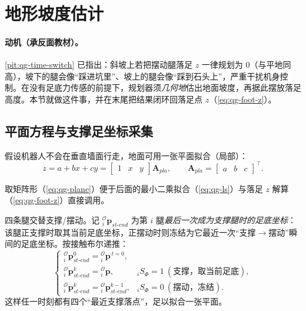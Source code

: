 \section{地形坡度估计}
\label{sec:qg-slope}

\paragraph{动机（承反面教材）。}
\cref{pit:qg-time-switch} 已指出：斜坡上若把摆动腿落足 $z$ 一律规划为 $0$（与平地同高），坡下的腿会像“踩进坑里”、坡上的腿会像“踩到石头上”，严重干扰机身控制\cite{yu2021quadruped}。在没有足底力传感的前提下，规划器须\emph{几何地}估出地面坡度，再据此摆放落足高度。本节就做这件事，并在末尾把结果闭环回落足点 $z$（\cref{eq:qg-foot-z}）。

\subsection{平面方程与支撑足坐标采集}
\label{subsec:qg-plane}

假设机器人不会在垂直墙面行走，地面可用一张平面拟合（局部）\cite{yu2021quadruped}：
\begin{equation}
  z=a+bx+cy=\begin{bmatrix}1 & x & y\end{bmatrix}\mathbf{A}_{pla},
  \qquad
  \mathbf{A}_{pla}=\begin{bmatrix}a & b & c\end{bmatrix}^\top.
  \label{eq:qg-plane}
\end{equation}

取矩阵形（\cref{eq:qg-plane}）便于后面的最小二乘拟合（\cref{eq:qg-ls}）与落足 $z$ 解算（\cref{eq:qg-foot-z}）直接调用。

四条腿交替支撑/摆动。记 ${}_i^{\mathcal{O}}\boldsymbol{p}_{st\text{-}end}$ 为第 $i$ 腿\emph{最后一次成为支撑腿时的足底坐标}：该腿正支撑时取其当前足底坐标，正摆动时则冻结为它最近一次“支撑$\to$摆动”瞬间的足底坐标。按接触布尔递推\cite{yu2021quadruped}：
\begin{equation}
  \begin{cases}
  {}_i^{\mathcal{O}}\boldsymbol{p}_{st\text{-}end}^{0}={}_i^{\mathcal{O}}\boldsymbol{p}^{\,t=0},\\
  {}_i^{\mathcal{O}}\boldsymbol{p}_{st\text{-}end}^{k}={}_i^{\mathcal{O}}\boldsymbol{p}, & {}_iS_\Phi=1\ (\text{支撑，取当前足底}),\\
  {}_i^{\mathcal{O}}\boldsymbol{p}_{st\text{-}end}^{k}={}_i^{\mathcal{O}}\boldsymbol{p}_{st\text{-}end}^{k-1}, & {}_iS_\Phi=0\ (\text{摆动，冻结}).
  \end{cases}
  \label{eq:qg-stend}
\end{equation}
这样任一时刻都有四个“最近支撑落点”，足以拟合一张平面。

